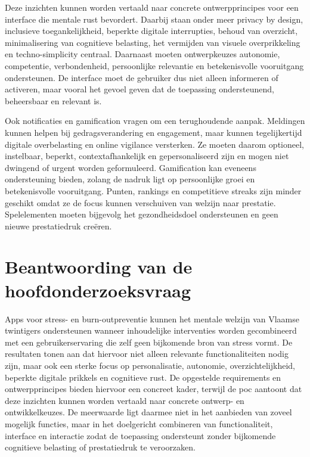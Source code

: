 \vspace{1em}

Deze inzichten kunnen worden vertaald naar concrete ontwerpprincipes voor een interface die mentale rust bevordert. Daarbij staan onder meer privacy by design, inclusieve toegankelijkheid, beperkte digitale interrupties, behoud van overzicht, minimalisering van cognitieve belasting, het vermijden van visuele overprikkeling en techno-simplicity centraal. Daarnaast moeten ontwerpkeuzes autonomie, competentie, verbondenheid, persoonlijke relevantie en betekenisvolle vooruitgang ondersteunen. De interface moet de gebruiker dus niet alleen informeren of activeren, maar vooral het gevoel geven dat de toepassing ondersteunend, beheersbaar en relevant is.

\vspace{1em}

Ook notificaties en gamification vragen om een terughoudende aanpak. Meldingen kunnen helpen bij gedragsverandering en engagement, maar kunnen tegelijkertijd digitale overbelasting en online vigilance versterken. Ze moeten daarom optioneel, instelbaar, beperkt, contextafhankelijk en gepersonaliseerd zijn en mogen niet dwingend of urgent worden geformuleerd. Gamification kan eveneens ondersteuning bieden, zolang de nadruk ligt op persoonlijke groei en betekenisvolle vooruitgang. Punten, rankings en competitieve streaks zijn minder geschikt omdat ze de focus kunnen verschuiven van welzijn naar prestatie. Spelelementen moeten bijgevolg het gezondheidsdoel ondersteunen en geen nieuwe prestatiedruk creëren.

\vspace{1em}


\section{Beantwoording van de hoofdonderzoeksvraag}
\label{sec:beantwoording-hoofdonderzoeksvraag}

\vspace{1em}

Apps voor stress- en burn-outpreventie kunnen het mentale welzijn van Vlaamse twintigers ondersteunen wanneer inhoudelijke interventies worden gecombineerd met een gebruikerservaring die zelf geen bijkomende bron van stress vormt. De resultaten tonen aan dat hiervoor niet alleen relevante functionaliteiten nodig zijn, maar ook een sterke focus op personalisatie, autonomie, overzichtelijkheid, beperkte digitale prikkels en cognitieve rust. De opgestelde requirements en ontwerpprincipes bieden hiervoor een concreet kader, terwijl de \acrshort{poc} aantoont dat deze inzichten kunnen worden vertaald naar concrete ontwerp- en ontwikkelkeuzes. De meerwaarde ligt daarmee niet in het aanbieden van zoveel mogelijk functies, maar in het doelgericht combineren van functionaliteit, interface en interactie zodat de toepassing ondersteunt zonder bijkomende cognitieve belasting of prestatiedruk te veroorzaken.

